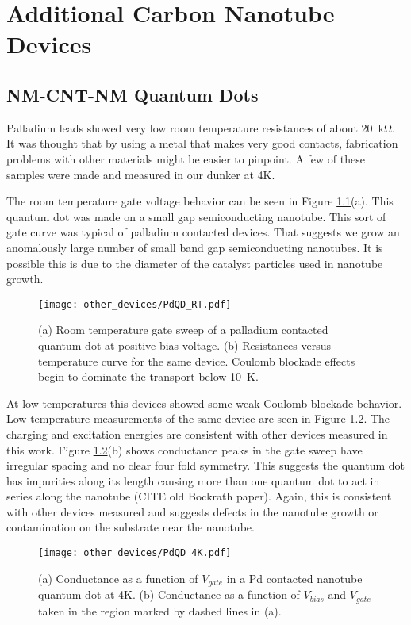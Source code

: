 \chapter{Additional Carbon Nanotube Devices}
\label{sec:other_devices}

\section{NM-CNT-NM Quantum Dots}

Palladium leads showed very low room temperature resistances of about \SI{20}{\kilo\ohm}. It was thought that by using a metal that makes very good contacts, fabrication problems with other materials might be easier to pinpoint. A few of these samples were made and measured in our dunker at 4K. 

The room temperature gate voltage behavior can be seen in Figure \ref{fig:PdQD_rt}(a). This quantum dot was made on a small gap semiconducting nanotube. This sort of gate curve was typical of palladium contacted devices. That suggests we grow an anomalously large number of small band gap semiconducting nanotubes. It is possible this is due to the diameter of the catalyst particles used in nanotube growth.

\begin{figure}
    \centering
    \texttt{[image: other\_devices/PdQD\_RT.pdf]}
    \caption{(a) Room temperature gate sweep of a palladium contacted quantum dot at positive bias voltage. (b) Resistances versus temperature curve for the same device. Coulomb blockade effects begin to dominate the transport below \SI{10}{\kelvin}.}
    \label{fig:PdQD_rt}
\end{figure}

At low temperatures this devices showed some weak Coulomb blockade behavior. Low temperature measurements of the same device are seen in Figure \ref{fig:PdQD_4K}. The charging and excitation energies are consistent with other devices measured in this work. Figure \ref{fig:PdQD_4K}(b) shows conductance peaks in the gate sweep have irregular spacing and no clear four fold symmetry. This suggests the quantum dot has impurities along its length causing more than one quantum dot to act in series along the nanotube (CITE old Bockrath paper). Again, this is consistent with other devices measured and suggests defects in the nanotube growth or contamination on the substrate near the nanotube.

\begin{figure}
    \centering
    \texttt{[image: other\_devices/PdQD\_4K.pdf]}
    \caption{(a) Conductance as a function of $V_{gate}$ in a Pd contacted nanotube quantum dot at 4K. (b) Conductance as a function of $V_{bias}$ and $V_{gate}$ taken in the region marked by dashed lines in (a).}
    \label{fig:PdQD_4K}
\end{figure}

